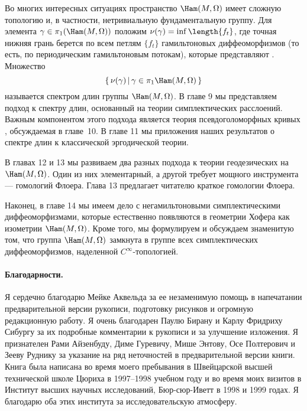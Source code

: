 Во многих интересных ситуациях пространство $\Ham(M,\Omega)$ имеет сложную топологию и, в частности, нетривиальную фундаментальную группу.
Для элемента $\gamma\in\pi_1(\Ham(M,\Omega))$ положим $\nu(\gamma) \z= \inf \length \{f_t\}$, где
точная нижняя грань берется по всем петлям $\{f_t\}$ гамильтоновых
диффеоморфизмов (то есть, по периодическим гамильтоновым потокам),
которые представляют  .
Множество
\[\set{\nu(\gamma)}{\gamma\in\pi_{1}\Ham(M,\Omega)}\]
называется спектром длин группы $\Ham(M,\Omega)$.
В главе 9 мы представляем подход к спектру длин, основанный на теории симплектических расслоений.
Важным компонентом этого подхода является теория  псевдоголоморфных кривых , обсуждаемая в главе~10.
В главе 11 мы  приложения наших результатов о спектре длин к классической эргодической теории.

В главах 12 и 13 мы развиваем два разных подхода к теории геодезических на $\Ham(M,\Omega)$.
Один из них элементарный, а другой требует мощного инструмента --- гомологий Флоера.
Глава 13 предлагает читателю краткое  гомологии Флоера.

Наконец, в главе 14 мы имеем дело с негамильтоновыми симплектическими диффеоморфизмами, которые естественно появляются в геометрии Хофера как изометрии $\Ham(M,\Omega)$.
Кроме того, мы формулируем и обсуждаем знаменитую 
 том, что группа $\Ham(M,\Omega)$ замкнута в группе всех симплектических диффеоморфизмов, наделенной $C^\infty$-топологией. 

\paragraph*{Благодарности.}
Я сердечно благодарю Мейке Аквельда за ее незаменимую помощь в напечатании предварительной версии рукописи,
подготовку рисунков и огромную редакционную работу.
Я очень благодарен Паулю Бирану и Карлу Фридриху Сибургу за их подробные комментарии к рукописи и за улучшение изложения.
Я признателен Рами Айзенбуду, Диме Гуревичу, Мише Энтову, Осе Полтерович и Зееву Руднику за указание на ряд неточностей в предварительной версии книги.
Книга была написана во время моего пребывания в Швейцарской высшей технической школе Цюриха в 1997--1998 учебном году и во время моих визитов в Институт высших научных исследований, Бюр-сюр-Иветт в 1998 и 1999 годах.
Я благодарю оба этих института за  исследовательскую атмосферу. 
